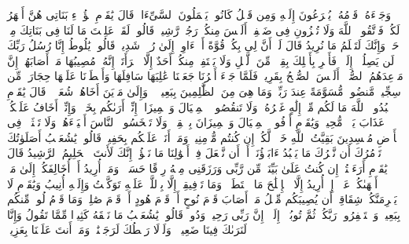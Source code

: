 \startbuffer[\q:11:78]
وَجَاۤءَهُۥ قَوۡمُهُۥ یُهۡرَعُونَ إِلَیۡهِ وَمِن قَبۡلُ كَانُوا۟ یَعۡمَلُونَ ٱلسَّیِّءَاتِۚ قَالَ یَٰقَوۡمِ هَٰۤؤُلَاۤءِ بَنَاتِی هُنَّ أَطۡهَرُ لَكُمۡۖ فَٱتَّقُوا۟ ٱللَّهَ وَلَا تُخۡزُونِ فِی ضَیۡفِیۤۖ أَلَیۡسَ مِنكُمۡ رَجُلࣱ رَّشِیدࣱ%
\stopbuffer
\startbuffer[\q:11:79]
قَالُوا۟ لَقَدۡ عَلِمۡتَ مَا لَنَا فِی بَنَاتِكَ مِنۡ حَقࣲّ وَإِنَّكَ لَتَعۡلَمُ مَا نُرِیدُ%
\stopbuffer
\startbuffer[\q:11:80]
قَالَ لَوۡ أَنَّ لِی بِكُمۡ قُوَّةً أَوۡ ءَاوِیۤ إِلَىٰ رُكۡنࣲ شَدِیدࣲ%
\stopbuffer
\startbuffer[\q:11:81]
قَالُوا۟ یَٰلُوطُ إِنَّا رُسُلُ رَبِّكَ لَن یَصِلُوۤا۟ إِلَیۡكَۖ فَأَسۡرِ بِأَهۡلِكَ بِقِطۡعࣲ مِّنَ ٱلَّیۡلِ وَلَا یَلۡتَفِتۡ مِنكُمۡ أَحَدٌ إِلَّا ٱمۡرَأَتَكَۖ إِنَّهُۥ مُصِیبُهَا مَاۤ أَصَابَهُمۡۚ إِنَّ مَوۡعِدَهُمُ ٱلصُّبۡحُۚ أَلَیۡسَ ٱلصُّبۡحُ بِقَرِیبࣲ%
\stopbuffer
\startbuffer[\q:11:82]
فَلَمَّا جَاۤءَ أَمۡرُنَا جَعَلۡنَا عَٰلِیَهَا سَافِلَهَا وَأَمۡطَرۡنَا عَلَیۡهَا حِجَارَةࣰ مِّن سِجِّیلࣲ مَّنضُودࣲ%
\stopbuffer
\startbuffer[\q:11:83]
مُّسَوَّمَةً عِندَ رَبِّكَۖ وَمَا هِیَ مِنَ ٱلظَّٰلِمِینَ بِبَعِیدࣲ%
\stopbuffer
\startbuffer[\q:11:84]
۞ وَإِلَىٰ مَدۡیَنَ أَخَاهُمۡ شُعَیۡبࣰاۚ قَالَ یَٰقَوۡمِ ٱعۡبُدُوا۟ ٱللَّهَ مَا لَكُم مِّنۡ إِلَٰهٍ غَیۡرُهُۥۖ وَلَا تَنقُصُوا۟ ٱلۡمِكۡیَالَ وَٱلۡمِیزَانَۖ إِنِّیۤ أَرَىٰكُم بِخَیۡرࣲ وَإِنِّیۤ أَخَافُ عَلَیۡكُمۡ عَذَابَ یَوۡمࣲ مُّحِیطࣲ%
\stopbuffer
\startbuffer[\q:11:85]
وَیَٰقَوۡمِ أَوۡفُوا۟ ٱلۡمِكۡیَالَ وَٱلۡمِیزَانَ بِٱلۡقِسۡطِۖ وَلَا تَبۡخَسُوا۟ ٱلنَّاسَ أَشۡیَاۤءَهُمۡ وَلَا تَعۡثَوۡا۟ فِی ٱلۡأَرۡضِ مُفۡسِدِینَ%
\stopbuffer
\startbuffer[\q:11:86]
بَقِیَّتُ ٱللَّهِ خَیۡرࣱ لَّكُمۡ إِن كُنتُم مُّؤۡمِنِینَۚ وَمَاۤ أَنَا۠ عَلَیۡكُم بِحَفِیظࣲ%
\stopbuffer
\startbuffer[\q:11:87]
قَالُوا۟ یَٰشُعَیۡبُ أَصَلَوٰتُكَ تَأۡمُرُكَ أَن نَّتۡرُكَ مَا یَعۡبُدُ ءَابَاۤؤُنَاۤ أَوۡ أَن نَّفۡعَلَ فِیۤ أَمۡوَٰلِنَا مَا نَشَٰۤؤُا۟ۖ إِنَّكَ لَأَنتَ ٱلۡحَلِیمُ ٱلرَّشِیدُ%
\stopbuffer
\startbuffer[\q:11:88]
قَالَ یَٰقَوۡمِ أَرَءَیۡتُمۡ إِن كُنتُ عَلَىٰ بَیِّنَةࣲ مِّن رَّبِّی وَرَزَقَنِی مِنۡهُ رِزۡقًا حَسَنࣰاۚ وَمَاۤ أُرِیدُ أَنۡ أُخَالِفَكُمۡ إِلَىٰ مَاۤ أَنۡهَىٰكُمۡ عَنۡهُۚ إِنۡ أُرِیدُ إِلَّا ٱلۡإِصۡلَٰحَ مَا ٱسۡتَطَعۡتُۚ وَمَا تَوۡفِیقِیۤ إِلَّا بِٱللَّهِۚ عَلَیۡهِ تَوَكَّلۡتُ وَإِلَیۡهِ أُنِیبُ%
\stopbuffer
\startbuffer[\q:11:89]
وَیَٰقَوۡمِ لَا یَجۡرِمَنَّكُمۡ شِقَاقِیۤ أَن یُصِیبَكُم مِّثۡلُ مَاۤ أَصَابَ قَوۡمَ نُوحٍ أَوۡ قَوۡمَ هُودٍ أَوۡ قَوۡمَ صَٰلِحࣲۚ وَمَا قَوۡمُ لُوطࣲ مِّنكُم بِبَعِیدࣲ%
\stopbuffer
\startbuffer[\q:11:90]
وَٱسۡتَغۡفِرُوا۟ رَبَّكُمۡ ثُمَّ تُوبُوۤا۟ إِلَیۡهِۚ إِنَّ رَبِّی رَحِیمࣱ وَدُودࣱ%
\stopbuffer
\startbuffer[\q:11:91]
قَالُوا۟ یَٰشُعَیۡبُ مَا نَفۡقَهُ كَثِیرࣰا مِّمَّا تَقُولُ وَإِنَّا لَنَرَىٰكَ فِینَا ضَعِیفࣰاۖ وَلَوۡلَا رَهۡطُكَ لَرَجَمۡنَٰكَۖ وَمَاۤ أَنتَ عَلَیۡنَا بِعَزِیزࣲ%
